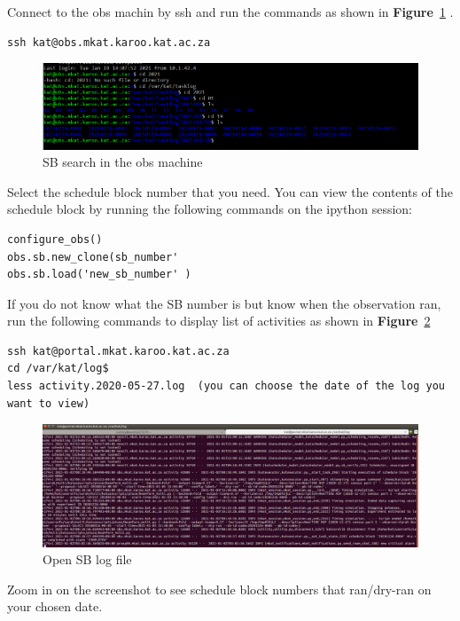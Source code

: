 Connect to the obs machin by ssh and run the commands as shown in \textbf{Figure}~\ref{fig:image116} .
\begin{lstlisting}[style=DOS]
ssh kat@obs.mkat.karoo.kat.ac.za
\end{lstlisting}



\begin{figure}[!thb]
	\centering
	\includegraphics[scale=0.35]{Chapters/images/image116.png}
	
	\caption{SB search in the obs machine}
	\label{fig:image116}
\end{figure}
Select the schedule block number that you need.
You can view the contents of the schedule block by running the following commands on the ipython session: 

\begin{lstlisting}[style=DOS]
configure_obs()
obs.sb.new_clone(sb_number'
obs.sb.load('new_sb_number' )
\end{lstlisting}


If you do not know what the SB number is but know when the observation ran, run the following commands to display list of activities as shown in \textbf{Figure}~\ref{fig:image42}
\begin{lstlisting}[style=DOS]
ssh kat@portal.mkat.karoo.kat.ac.za
cd /var/kat/log$ 
less activity.2020-05-27.log  (you can choose the date of the log you want to view)
\end{lstlisting} 



\begin{figure}[!thb]
	\centering
	\includegraphics[scale=0.25]{Chapters/images/image42.png}
	
	\caption{Open SB log file}
	\label{fig:image42}
\end{figure}
Zoom in on the screenshot to see schedule block numbers that ran/dry-ran on your chosen date.

